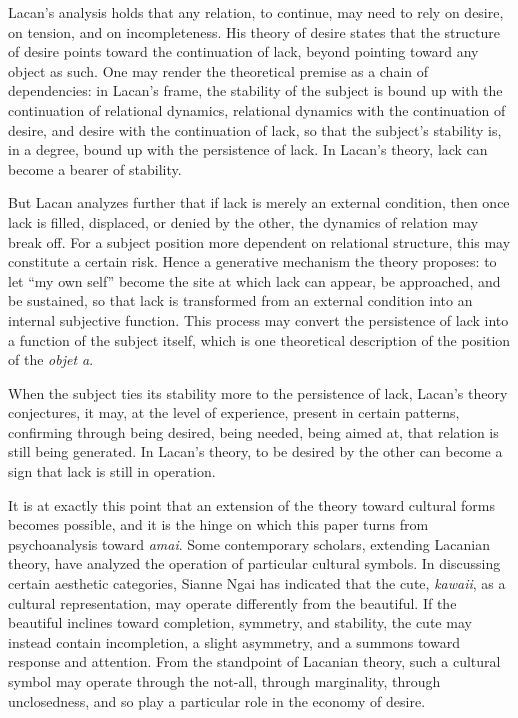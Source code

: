 Lacan's analysis holds that any relation, to continue, may need to rely on desire, on tension, and on incompleteness. His theory of desire states that the structure of desire points toward the continuation of lack, beyond pointing toward any object as such. One may render the theoretical premise as a chain of dependencies: in Lacan's frame, the stability of the subject is bound up with the continuation of relational dynamics, relational dynamics with the continuation of desire, and desire with the continuation of lack, so that the subject's stability is, in a degree, bound up with the persistence of lack. In Lacan's theory, lack can become a bearer of stability.

But Lacan analyzes further that if lack is merely an external condition, then once lack is filled, displaced, or denied by the other, the dynamics of relation may break off. For a subject position more dependent on relational structure, this may constitute a certain risk. Hence a generative mechanism the theory proposes: to let ``my own self'' become the site at which lack can appear, be approached, and be sustained, so that lack is transformed from an external condition into an internal subjective function. This process may convert the persistence of lack into a function of the subject itself, which is one theoretical description of the position of the \textit{objet a}.

When the subject ties its stability more to the persistence of lack, Lacan's theory conjectures, it may, at the level of experience, present in certain patterns, confirming through being desired, being needed, being aimed at, that relation is still being generated. In Lacan's theory, to be desired by the other can become a sign that lack is still in operation.

It is at exactly this point that an extension of the theory toward cultural forms becomes possible, and it is the hinge on which this paper turns from psychoanalysis toward \textit{amai}. Some contemporary scholars, extending Lacanian theory, have analyzed the operation of particular cultural symbols. In discussing certain aesthetic categories, Sianne Ngai has indicated that the cute, \textit{kawaii}, as a cultural representation, may operate differently from the beautiful. If the beautiful inclines toward completion, symmetry, and stability, the cute may instead contain incompletion, a slight asymmetry, and a summons toward response and attention. From the standpoint of Lacanian theory, such a cultural symbol may operate through the not-all, through marginality, through unclosedness, and so play a particular role in the economy of desire.

